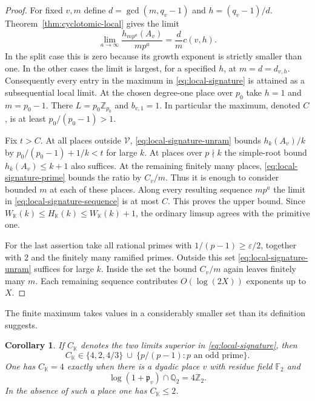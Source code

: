 \documentclass[11pt,letterpaper]{article}
\newtheorem{corollary}[corollary]{Corollary}
\theoremstyle{definition}
\numberwithin{equation}{section}
\begin{document}
\begin{proof}
For fixed $v,m$ define $d=\gcd(m,q_v-1)$ and $h=(q_v-1)/d$.
Theorem~\ref{thm:cyclotomic-local} gives the limit
\begin{equation}\label{eq:local-signature-sequence}
       \lim_{a\to\infty}\frac{h_{mp^a}(A_v)}{mp^a}
                            =\frac{d}{m}c(v,h).
\end{equation}
In the split case this is zero because its growth exponent is
strictly smaller than one. In the other cases the limit is largest,
for a specified $h$, at $m=d=d_{v,h}$. Consequently every entry
in the maximum in \eqref{eq:local-signature} is attained as a
subsequential local limit. At the chosen degree-one place over
$p_0$ take $h=1$ and $m=p_0-1$. There $L=p_0\mathbb Z_{p_0}$
and $b_{v,1}=1$. In particular the maximum, denoted $C$, is at
least $p_0/(p_0-1)>1$.

Fix $t>C$. At all places outside $\mathcal V$,
\eqref{eq:local-signature-unram} bounds $h_k(A_v)/k$ by
$p_0/(p_0-1)+1/k<t$ for large $k$. At places over $p\nmid k$ the
simple-root bound $h_k(A_v)\le k+1$ also suffices. At the remaining
finitely many places, \eqref{eq:local-signature-prime} bounds the
ratio by $C_v/m$. Thus it is enough to consider bounded $m$ at each
of these places. Along every resulting sequence $mp^a$ the limit
in \eqref{eq:local-signature-sequence} is at most $C$. This proves
the upper bound. Since $W_{\mathbb K}(k)\le H_{\mathbb K}(k)\le
W_{\mathbb K}(k)+1$, the ordinary limsup agrees with the primitive one.

For the last assertion take all rational primes with
$1/(p-1)\ge\varepsilon/2$, together with $2$ and the finitely many
ramified primes. Outside this set \eqref{eq:local-signature-unram}
suffices for large $k$. Inside the set the bound
$C_v/m$ again leaves finitely many $m$. Each remaining sequence
contributes $O(\log(2X))$ exponents up to $X$.
\end{proof}

The finite maximum takes values in a considerably smaller set than
its definition suggests.

\begin{corollary}\label{cor:local-signature-values}
If $C_{\mathbb K}$ denotes the two limits superior in
\eqref{eq:local-signature}, then
\[
 C_{\mathbb K}\in \{4,2,4/3\}\ \cup\
                  \{p/(p-1):p\text{ an odd prime}\}.
\]
One has $C_{\mathbb K}=4$ exactly when there is a dyadic place $v$
with residue field $\mathbb F_2$ and
\[
             \log(1+\mathfrak p_v)\cap\mathbb Q_2=4\mathbb Z_2.
\]
In the absence of such a place one has $C_{\mathbb K}\le2$.
\end{corollary}
\end{document}
